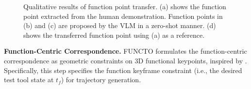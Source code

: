  



\begin{figure}[t]
  \centering
  \hspace*{-0.1in}
    \vspace*{-0.3in}
  \caption{Qualitative results of function point transfer. (a) shows the function point extracted from the human demonstration. Function points in (b) and (c) are proposed by the VLM in a zero-shot manner. (d) shows the transferred function point using (a) as a reference.}
  \label{fig:keypoint_proposal}
  \vspace*{-0.2in}
\end{figure}





\noindent \textbf{Function-Centric Correspondence.} FUNCTO formulates the function-centric correspondence as geometric constraints on 3D functional keypoints, inspired by \cite{manuelli2019kpam}. Specifically, this step specifies the function keyframe constraint (i.e., the desired test tool state at $t_f$) for trajectory generation.

